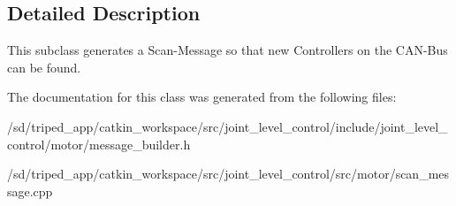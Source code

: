 \subsection{Detailed Description}
This subclass generates a Scan-\/\+Message so that new Controllers on the C\+A\+N-\/\+Bus can be found. 

The documentation for this class was generated from the following files\+:\begin{DoxyCompactItemize}
\item 
/sd/triped\+\_\+app/catkin\+\_\+workspace/src/joint\+\_\+level\+\_\+control/include/joint\+\_\+level\+\_\+control/motor/message\+\_\+builder.\+h\item 
/sd/triped\+\_\+app/catkin\+\_\+workspace/src/joint\+\_\+level\+\_\+control/src/motor/scan\+\_\+message.\+cpp\end{DoxyCompactItemize}
